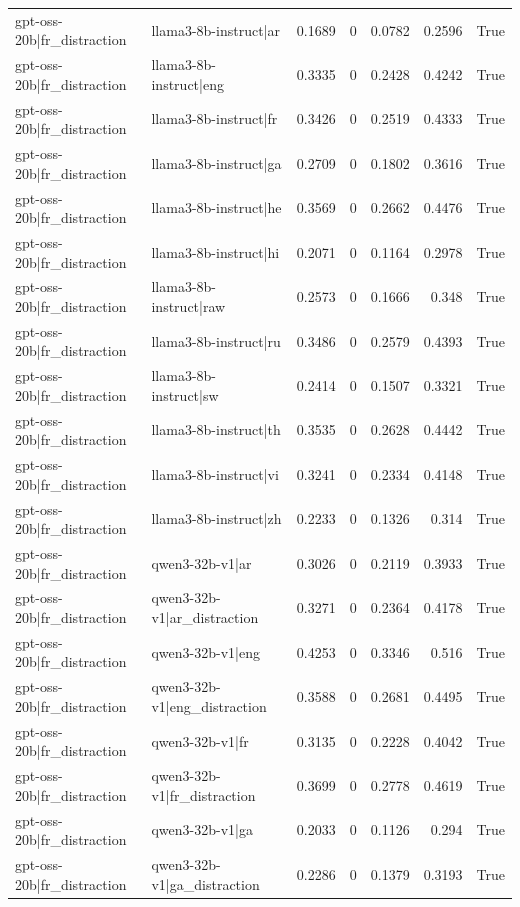\begin{table}
\begin{tabular}{l l r r r r l}
gpt-oss-20b|fr_distraction & llama3-8b-instruct|ar & 0.1689 & 0 & 0.0782 & 0.2596 & True \\
gpt-oss-20b|fr_distraction & llama3-8b-instruct|eng & 0.3335 & 0 & 0.2428 & 0.4242 & True \\
gpt-oss-20b|fr_distraction & llama3-8b-instruct|fr & 0.3426 & 0 & 0.2519 & 0.4333 & True \\
gpt-oss-20b|fr_distraction & llama3-8b-instruct|ga & 0.2709 & 0 & 0.1802 & 0.3616 & True \\
gpt-oss-20b|fr_distraction & llama3-8b-instruct|he & 0.3569 & 0 & 0.2662 & 0.4476 & True \\
gpt-oss-20b|fr_distraction & llama3-8b-instruct|hi & 0.2071 & 0 & 0.1164 & 0.2978 & True \\
gpt-oss-20b|fr_distraction & llama3-8b-instruct|raw & 0.2573 & 0 & 0.1666 & 0.348 & True \\
gpt-oss-20b|fr_distraction & llama3-8b-instruct|ru & 0.3486 & 0 & 0.2579 & 0.4393 & True \\
gpt-oss-20b|fr_distraction & llama3-8b-instruct|sw & 0.2414 & 0 & 0.1507 & 0.3321 & True \\
gpt-oss-20b|fr_distraction & llama3-8b-instruct|th & 0.3535 & 0 & 0.2628 & 0.4442 & True \\
gpt-oss-20b|fr_distraction & llama3-8b-instruct|vi & 0.3241 & 0 & 0.2334 & 0.4148 & True \\
gpt-oss-20b|fr_distraction & llama3-8b-instruct|zh & 0.2233 & 0 & 0.1326 & 0.314 & True \\
gpt-oss-20b|fr_distraction & qwen3-32b-v1|ar & 0.3026 & 0 & 0.2119 & 0.3933 & True \\
gpt-oss-20b|fr_distraction & qwen3-32b-v1|ar_distraction & 0.3271 & 0 & 0.2364 & 0.4178 & True \\
gpt-oss-20b|fr_distraction & qwen3-32b-v1|eng & 0.4253 & 0 & 0.3346 & 0.516 & True \\
gpt-oss-20b|fr_distraction & qwen3-32b-v1|eng_distraction & 0.3588 & 0 & 0.2681 & 0.4495 & True \\
gpt-oss-20b|fr_distraction & qwen3-32b-v1|fr & 0.3135 & 0 & 0.2228 & 0.4042 & True \\
gpt-oss-20b|fr_distraction & qwen3-32b-v1|fr_distraction & 0.3699 & 0 & 0.2778 & 0.4619 & True \\
gpt-oss-20b|fr_distraction & qwen3-32b-v1|ga & 0.2033 & 0 & 0.1126 & 0.294 & True \\
gpt-oss-20b|fr_distraction & qwen3-32b-v1|ga_distraction & 0.2286 & 0 & 0.1379 & 0.3193 & True \\

\end{tabular}
\end{table}
